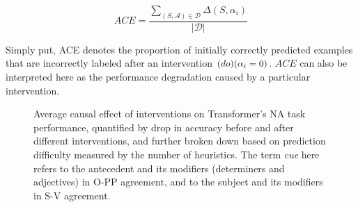\begin{equation}
ACE = \frac{\sum_{(S,\mathcal{A}) \in \mathcal{D}} \Delta(S,\alpha_i)}{|\mathcal{D}|}
\end{equation}

Simply put, ACE denotes the proportion of initially correctly predicted examples that are incorrectly labeled after an intervention $\text(do)(\alpha_i=0)$. $ACE$ can also be interpreted here as the performance degradation caused by a particular intervention.

 \begin{figure}[htbp]
\caption{Average causal effect of interventions on Transformer's NA task performance, quantified by drop in accuracy before and after different interventions, and further broken down based on prediction difficulty measured by the number of heuristics. The term \emph{cue} here refers to the antecedent and its modifiers (determiners and adjectives) in O-PP agreement, and to the subject and its modifiers in S-V agreement.} \label{fig:causal_res}
\end{figure} 


